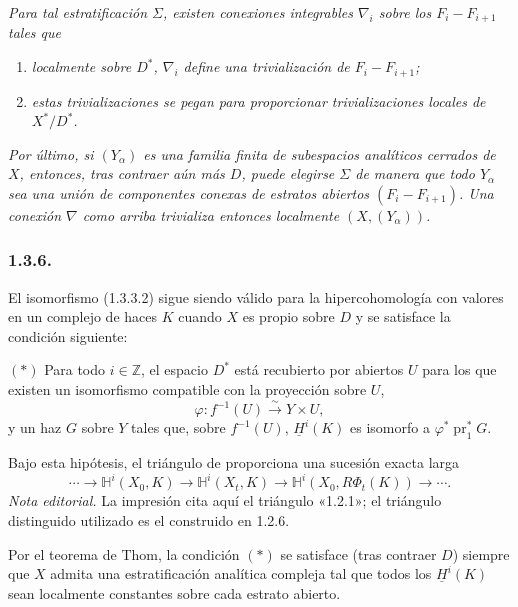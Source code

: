 \textit{Para tal estratificación $\Sigma$, existen conexiones integrables
$\nabla_i$ sobre los $F_i-F_{i+1}$ tales que}

\begin{enumerate}[label=(\roman*),leftmargin=2.7em]
\item \textit{localmente sobre $D^*$, $\nabla_i$ define una trivialización de
$F_i-F_{i+1}$;}

\item \textit{estas trivializaciones se pegan para proporcionar
trivializaciones locales de $X^*/D^*$.}
\end{enumerate}

\textit{Por último, si $(Y_\alpha)$ es una familia finita de subespacios
analíticos cerrados de $X$, entonces, tras contraer aún más $D$, puede elegirse
$\Sigma$ de manera que todo $Y_\alpha$ sea una unión de componentes conexas de
estratos abiertos $(F_i-F_{i+1})$. Una conexión $\nabla$ como arriba
trivializa entonces localmente $(X,(Y_\alpha))$.}

\subsubsection*{1.3.6.}
El isomorfismo (1.3.3.2) sigue siendo válido para la hipercohomología con
valores en un complejo de haces $K$ cuando $X$ es propio sobre $D$ y se
satisface la condición siguiente:

\medskip
\noindent $(*)$ Para todo $i\in\mathbb Z$, el espacio $D^*$ está recubierto
por abiertos $U$ para los que existen un isomorfismo compatible con la
proyección sobre $U$,
\[
\varphi:f^{-1}(U)\xrightarrow{\ \sim\ }Y\times U,
\]
y un haz $G$ sobre $Y$ tales que, sobre $f^{-1}(U)$,
$\underline H^i(K)$ es isomorfo a $\varphi^*\operatorname{pr}_1^*G$.

Bajo esta hipótesis, el triángulo de  proporciona una
sucesión exacta larga
\begin{equation}\tag{1.3.6.1}
\cdots\longrightarrow
\mathbb H^i(X_0,K)\longrightarrow
\mathbb H^i(X_t,K)\longrightarrow
\mathbb H^i(X_0,R\Phi_t(K))\longrightarrow\cdots.
\end{equation}
\noindent\emph{Nota editorial.} La impresión cita aquí el triángulo «1.2.1»;
el triángulo distinguido utilizado es el construido en 1.2.6.

Por el teorema de Thom, la condición $(*)$ se satisface (tras contraer $D$)
siempre que $X$ admita una estratificación analítica compleja tal que todos
los $\underline H^i(K)$ sean localmente constantes sobre cada estrato abierto.


